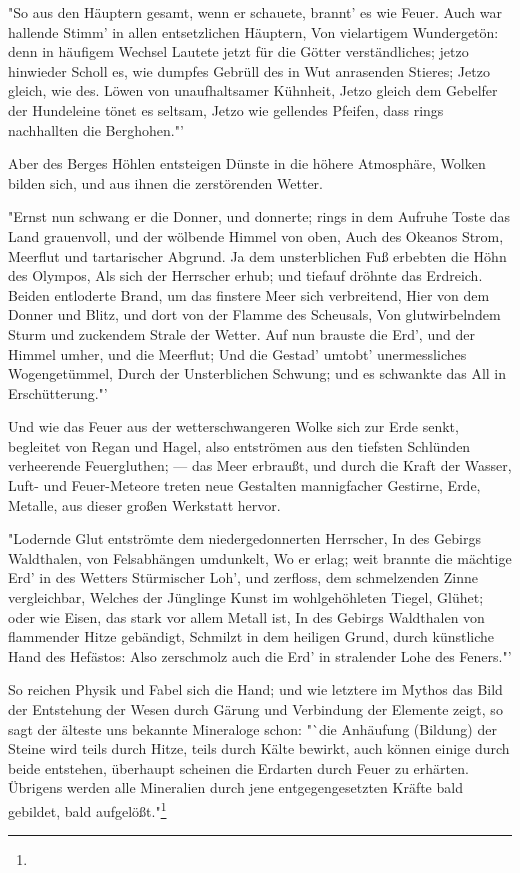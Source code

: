 \documentclass[a4paper, 11pt, oneside, polutonikogreek, german]{article}
\begin{document}
"So aus den Häuptern gesamt, wenn er schauete, brannt' es wie Feuer. Auch war hallende Stimm' in allen entsetzlichen Häuptern, Von vielartigem Wundergetön: denn in häufigem Wechsel Lautete jetzt für die Götter verständliches; jetzo hinwieder Scholl es, wie dumpfes Gebrüll des in Wut anrasenden Stieres; Jetzo gleich, wie des. Löwen von unaufhaltsamer Kühnheit, Jetzo gleich dem Gebelfer der Hundeleine tönet es seltsam, Jetzo wie gellendes Pfeifen, dass rings nachhallten die Berghohen."'

Aber des Berges Höhlen entsteigen Dünste in die höhere Atmosphäre, Wolken bilden sich, und aus ihnen die zerstörenden Wetter.

"Ernst nun schwang er die Donner, und donnerte; rings in dem Aufruhe Toste das Land grauenvoll, und der wölbende Himmel von oben, Auch des Okeanos Strom, Meerflut und tartarischer Abgrund. Ja dem unsterblichen Fuß erbebten die Höhn des Olympos, Als sich der Herrscher erhub; und tiefauf dröhnte das Erdreich. Beiden entloderte Brand, um das finstere Meer sich verbreitend, Hier von dem Donner und Blitz, und dort von der Flamme des Scheusals, Von glutwirbelndem Sturm und zuckendem Strale der Wetter. Auf nun brauste die Erd', und der Himmel umher, und die Meerflut; Und die Gestad' umtobt' unermessliches Wogengetümmel, Durch der Unsterblichen Schwung; und es schwankte das All in Erschütterung."'

Und wie das Feuer aus der wetterschwangeren Wolke sich zur Erde senkt, begleitet von Regan und Hagel, also entströmen aus den tiefsten Schlünden verheerende Feuergluthen; --- das Meer erbraußt, und durch die Kraft der Wasser, Luft- und Feuer-Meteore treten neue Gestalten mannigfacher Gestirne, Erde, Metalle, aus dieser großen Werkstatt hervor.

"Lodernde Glut entströmte dem niedergedonnerten Herrscher, In des Gebirgs Waldthalen, von Felsabhängen umdunkelt, Wo er erlag; weit brannte die mächtige Erd' in des Wetters Stürmischer Loh', und zerfloss, dem schmelzenden Zinne vergleichbar, Welches der Jünglinge Kunst im wohlgehöhleten Tiegel, Glühet; oder wie Eisen, das stark vor allem Metall ist, In des Gebirgs Waldthalen von flammender Hitze gebändigt, Schmilzt in dem heiligen Grund, durch künstliche Hand des Hefästos: Also zerschmolz auch die Erd' in stralender Lohe des Feners."'

So reichen Physik und Fabel sich die Hand; und wie letztere im Mythos das Bild der Entstehung der Wesen durch Gärung und Verbindung der Elemente zeigt, so sagt der älteste uns bekannte Mineraloge schon: "`die Anhäufung (Bildung) der Steine wird teils durch Hitze, teils durch Kälte bewirkt, auch können einige durch beide entstehen, überhaupt scheinen die Erdarten durch Feuer zu erhärten. Übrigens werden alle Mineralien durch jene entgegengesetzten Kräfte bald gebildet, bald aufgelößt."\footnote{}
\end{document}
